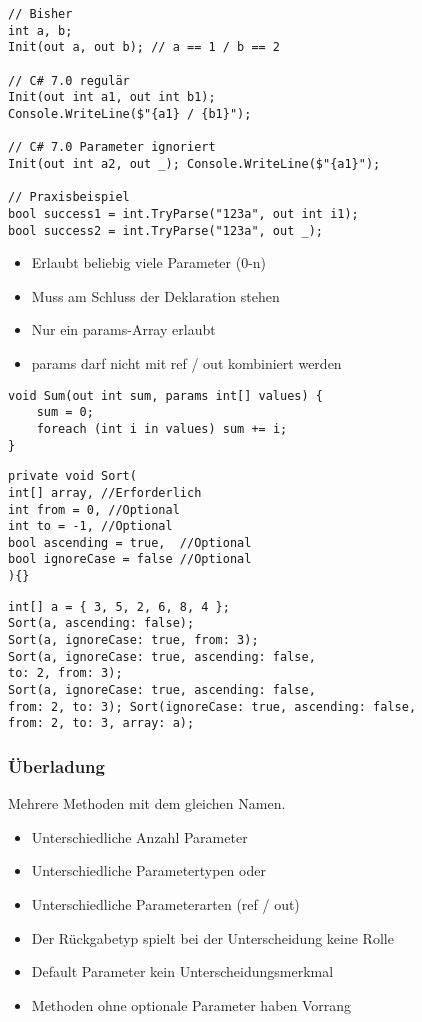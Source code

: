 \begin{multicols*}{2}
\begin{lstlisting}
// Bisher
int a, b;
Init(out a, out b); // a == 1 / b == 2

// C# 7.0 regulär
Init(out int a1, out int b1);
Console.WriteLine($"{a1} / {b1}");

// C# 7.0 Parameter ignoriert
Init(out int a2, out _); Console.WriteLine($"{a1}");

// Praxisbeispiel
bool success1 = int.TryParse("123a", out int i1);
bool success2 = int.TryParse("123a", out _);
\end{lstlisting} 
\begin{itemize}
    \item Erlaubt beliebig viele Parameter (0-n)
    \item Muss am Schluss der Deklaration stehen
    \item Nur ein params-Array erlaubt
    \item params darf nicht mit ref / out kombiniert werden
\end{itemize}
\begin{lstlisting}
void Sum(out int sum, params int[] values) {
    sum = 0;
    foreach (int i in values) sum += i;
}
\end{lstlisting}
\begin{lstlisting}
private void Sort( 
int[] array, //Erforderlich
int from = 0, //Optional
int to = -1, //Optional
bool ascending = true,  //Optional
bool ignoreCase = false //Optional
){}
\end{lstlisting}
\begin{lstlisting}
int[] a = { 3, 5, 2, 6, 8, 4 };
Sort(a, ascending: false);
Sort(a, ignoreCase: true, from: 3);
Sort(a, ignoreCase: true, ascending: false,
to: 2, from: 3);
Sort(a, ignoreCase: true, ascending: false,
from: 2, to: 3); Sort(ignoreCase: true, ascending: false,
from: 2, to: 3, array: a);
\end{lstlisting}
\subsubsection{Überladung}
Mehrere Methoden mit dem gleichen Namen.
\begin{itemize}
    \item Unterschiedliche Anzahl Parameter
    \item Unterschiedliche Parametertypen oder
    \item Unterschiedliche Parameterarten (ref / out)
    \item Der Rückgabetyp spielt bei der Unterscheidung keine Rolle
    \item Default Parameter kein Unterscheidungsmerkmal
    \item Methoden ohne optionale Parameter haben Vorrang
\end{itemize}


\end{multicols*}
